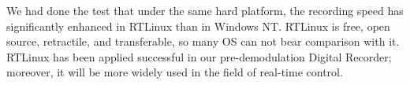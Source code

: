 \documentclass[10pt,a4paper]{article}
\begin{document}
\begin{multicols}{2}
We had done the test that  under the same hard platform, the recording speed has significantly enhanced in RTLinux than in Windows NT. RTLinux is free, open source, retractile, and transferable, so many OS can not bear comparison with it. RTLinux has been applied successful in our pre-demodulation Digital Recorder; moreover, it will be more widely used in the field of real-time control.


\begin{thebibliography}{9}%
\end{thebibliography}

\end{multicols}
\end{document}
